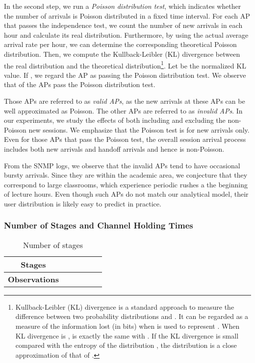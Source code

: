In the second step, we run a \emph{Poisson distribution test}, which indicates whether the number of arrivals is Poisson distributed in a fixed time interval. For each AP that passes the independence test, we count the number of new arrivals in each hour and calculate its real distribution.  Furthermore, by using the actual average arrival rate per hour, we can determine the corresponding theoretical  Poisson distribution. Then, we compute the Kullback-Leibler (KL) divergence  between the real distribution and the theoretical distribution\footnote{Kullback-Leibler (KL) divergence is a standard approach to measure the difference between two probability distributions  and . It can be regarded as a measure of the information lost (in bits) when  is used to represent . When KL divergence is ,  is exactly the same with . {If the KL divergence is small compared with the  entropy  of the distribution , the distribution  is a close approximation of that of .}}. Let  be the normalized KL value. If , we regard the AP as passing the Poisson distribution test.  We observe that  of the  APs pass the Poisson distribution test.

Those  APs are referred to as \emph{valid APs}, as the new arrivals at these APs can be well approximated as Poisson.  The other  APs are referred to as \emph{invalid APs}.  In our experiments, we study the effects of both including and excluding the non-Poisson new sessions.  We emphasize that the Poisson test is for new arrivals only.  Even for those APs that pass the Poisson test, the overall session arrival process includes both new arrivals and handoff arrivals and hence is non-Poisson.

From the SNMP logs, we observe that the invalid APs tend to have occasional bursty arrivals. Since they are within the academic area, we conjecture that they correspond to large classrooms, which experience periodic rushes a the beginning of lecture hours.  Even though such APs do not match our analytical model, their user distribution is likely easy to predict in practice.


\subsubsection{Number of Stages and Channel Holding Times}

\begin{table}[tbp]
\centering
\renewcommand{\arraystretch}{1.1}
\caption{Number of stages}
\label{table2}
\small
\begin{tabular}{|c|c|c|c|c|c| }
\hline
\bfseries Stages &   &    &  &  &    \\
\hline
\bfseries Observations    &   &    &  &    &     \\
\hline
\end{tabular}
\end{table}





